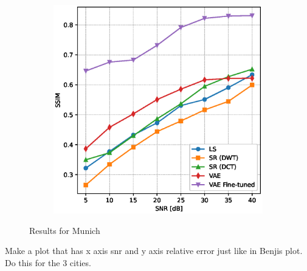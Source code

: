 \begin{figure}
\begin{subfigure}[b]{0.49\textwidth}
        \includegraphics[width=\textwidth]{figures/06_results/snr_plots/munich_ssim.eps}
    \end{subfigure}
    \caption{Results for Munich}
\end{figure}
Make a plot that has x axis snr and y axis relative error just like in Benjis plot.
Do this for the 3 cities.

